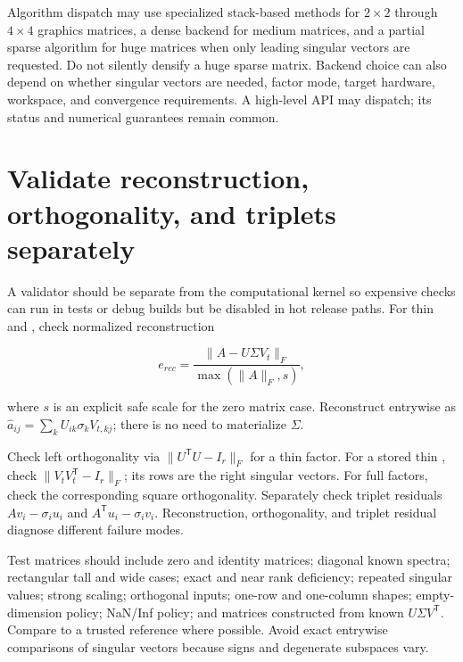 Algorithm dispatch may use specialized stack-based methods for \(2\times2\) through \(4\times4\) graphics matrices, a dense backend for medium matrices, and a partial sparse algorithm for huge matrices when only leading singular vectors are requested. Do not silently densify a huge sparse matrix. Backend choice can also depend on whether singular vectors are needed, factor mode, target hardware, workspace, and convergence requirements. A high-level API may dispatch; its status and numerical guarantees remain common.

\section{Validate reconstruction, orthogonality, and triplets separately}\label{02-foundations-ii-ch038-validate-reconstruction-orthogonality-and-triplets-separately}

\hypertarget{02-foundations-ii-ch038-validate-reconstruction-orthogonality-and-triplets-separately}{}

A validator should be separate from the computational kernel so expensive checks can run in tests or debug builds but be disabled in hot release paths. For thin  and , check normalized reconstruction

\[
e_{rec}=\frac{\|A-U\Sigma V_t\|_F}{\max(\|A\|_F,s)},
\]

where \(s\) is an explicit safe scale for the zero matrix case. Reconstruct entrywise as \(\hat a_{ij}=\sum_k U_{ik}\sigma_kV_{t,kj}\); there is no need to materialize \(\Sigma\).

Check left orthogonality via \(\|U^\mathsf TU-I_r\|_F\) for a thin factor. For a stored thin , check \(\|V_tV_t^\mathsf T-I_r\|_F\); its rows are the right singular vectors. For full factors, check the corresponding square orthogonality. Separately check triplet residuals \(Av_i-\sigma_i u_i\) and \(A^\mathsf Tu_i-\sigma_i v_i\). Reconstruction, orthogonality, and triplet residual diagnose different failure modes.

Test matrices should include zero and identity matrices; diagonal known spectra; rectangular tall and wide cases; exact and near rank deficiency; repeated singular values; strong scaling; orthogonal inputs; one-row and one-column shapes; empty-dimension policy; NaN/Inf policy; and matrices constructed from known \(U\Sigma V^\mathsf T\). Compare to a trusted reference where possible. Avoid exact entrywise comparisons of singular vectors because signs and degenerate subspaces vary.


